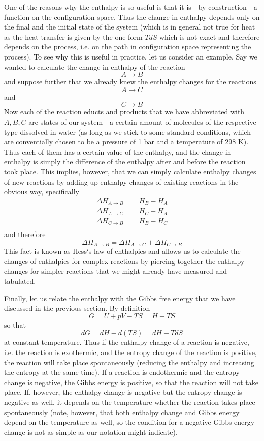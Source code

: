 \documentclass[a4paper, draft]{report}
\numberwithin{section}{chapter}
\numberwithin{equation}{chapter}
\theoremstyle{own}
\theoremstyle{remark}
\begin{document}
One of the reasons why the enthalpy is so useful is that it is - by construction - a function on the configuration space. Thus the change in enthalpy depends only on the final and the initial state of the system (which is in general not true for heat as the heat transfer is given by the one-form $T dS$ which is not exact and therefore depends on the process, i.e. on the path in configuration space representing the process). To see why this is useful in practice, let us consider an example. Say we wanted to calculate the change in enthalpy of the reaction 
$$
A \longrightarrow B
$$ 
and suppose further that we already knew the enthalpy changes for the reactions
$$
A \longrightarrow C 
$$
and 
$$
C \longrightarrow B
$$
Now each of the reaction educts and products that we have abbreviated with $A, B, C$ are states of our system - a certain amount of molecules of the respective type dissolved in water (as long as we stick to some standard conditions, which are conventially chosen to be a pressure of 1 bar and a temperature of 298 K). Thus each of them has a certain value of the enthalpy, and the change in enthalpy is simply the difference of the enthalpy after and before the reaction took place. This implies, however, that we can simply calculate enthalpy changes of new reactions by adding up enthalpy changes of existing reactions in the obvious way, specifically
\begin{align*}
\Delta H_{A \longrightarrow B } &= H_B - H_A \\
\Delta H_{A \longrightarrow C } &= H_C - H_A \\
\Delta H_{C \longrightarrow B } &= H_B - H_C \\
\end{align*}
and therefore
$$
\Delta H_{A \longrightarrow B } = \Delta H_{A \longrightarrow C } + \Delta H_{C \longrightarrow B }
$$
This fact is known as Hess`s law of enthalpies and allows us to calculate the changes of enthalpies for complex reactions by piercing together the enthalpy changes for simpler reactions that we might already have measured and tabulated.

Finally, let us relate the enthalpy with the Gibbs free energy that we have discussed in the previous section. By definition
$$
G = U + pV - TS = H - TS
$$
so that
$$
dG = dH - d(TS) = dH - T dS
$$
at constant temperature. Thus if the enthalpy change of a reaction is negative, i.e. the reaction is exothermic, and the entropy change of the reaction is positive, the reaction will take place spontaneously (reducing the enthalpy and increasing the entropy at the same time). If a reaction is endothermic and the entropy change is negative, the Gibbs energy is positive, so that the reaction will not take place. If, however, the enthalpy change is negative but the entropy change is negative as well, it depends on the temperature whether the reaction takes place spontaneously (note, however, that both enthalpy change and Gibbs energy depend on the temperature as well, so the condition for a negative Gibbs energy change	 is not as simple as our notation might indicate).
\end{document}
